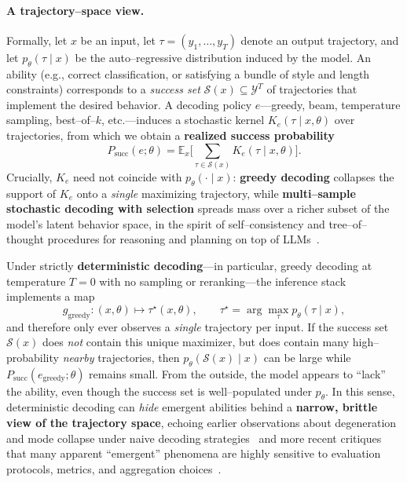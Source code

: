 \paragraph{A trajectory--space view.}
Formally, let $x$ be an input, let $\tau = (y_1,\dots,y_T)$ denote an output
trajectory, and let $p_\theta(\tau \mid x)$ be the auto--regressive
distribution induced by the model. An ability (e.g., correct classification,
or satisfying a bundle of style and length constraints) corresponds to a
\emph{success set} $\mathcal{S}(x) \subseteq \mathcal{Y}^T$ of trajectories
that implement the desired behavior. A decoding policy $e$---greedy, beam,
temperature sampling, best--of--$k$, etc.---induces a stochastic kernel
$K_e(\tau \mid x,\theta)$ over trajectories, from which we obtain a
\textbf{realized success probability}
\[
P_{\text{succ}}(e;\theta)
= \mathbb{E}_{x}\Bigg[ \sum_{\tau \in \mathcal{S}(x)}
                      K_e(\tau \mid x,\theta) \Bigg].
\]
Crucially, $K_e$ need not coincide with $p_\theta(\cdot \mid x)$:
\textbf{greedy decoding} collapses the support of $K_e$ onto a \emph{single}
maximizing trajectory, while \textbf{multi--sample stochastic decoding with selection}
spreads mass over a richer subset of the model's latent behavior space, in the spirit
of self--consistency and tree--of--thought procedures for reasoning and planning
on top of LLMs~\citep{wei2022chainofthought,wang2022selfconsistency,yao2023treeofthought}.

Under strictly \textbf{deterministic decoding}---in particular, greedy decoding at
temperature $T{=}0$ with no sampling or reranking---the inference stack implements
a map
\[
g_{\text{greedy}} : (x,\theta) \mapsto \tau^{\star}(x,\theta),
\qquad
\tau^{\star} = \arg\max_{\tau} p_\theta(\tau \mid x),
\]
and therefore only ever observes a \emph{single} trajectory per input.
If the success set $\mathcal{S}(x)$ does \emph{not} contain this unique maximizer,
but does contain many high--probability \emph{nearby} trajectories, then
$p_\theta(\mathcal{S}(x) \mid x)$ can be large while
$P_{\text{succ}}(e_{\text{greedy}};\theta)$ remains small.
From the outside, the model appears to ``lack'' the ability, even though the success
set is well--populated under $p_\theta$.
In this sense, deterministic decoding can \emph{hide} emergent abilities behind a
\textbf{narrow, brittle view of the trajectory space}, echoing earlier observations
about degeneration and mode collapse under naive decoding
strategies~\citep{holtzman2019curious} and more recent critiques that many
apparent ``emergent'' phenomena are highly sensitive to evaluation protocols,
metrics, and aggregation choices~\citep{sagawa2023emergent,schaeffer2023emergent}.

